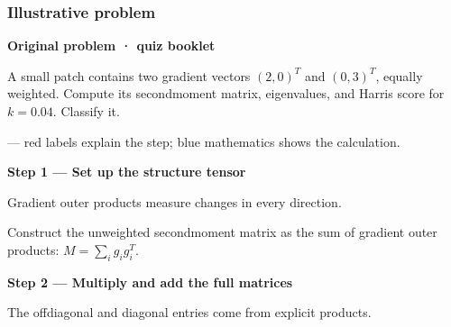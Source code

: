\documentclass[letterpaper,11pt,english,openany,oneside]{jupyterBook}
\begin{document}
\subsubsection{Illustrative problem}
\label{\detokenize{lectures/lecture05/quiz-workbook:illustrative-problem}}\label{\detokenize{lectures/lecture05/quiz-workbook:quiz-a2-q1}}
\par\medskip\textbf{Original problem · quiz booklet}\par\smallskip

\sphinxAtStartPar
A small patch contains two gradient vectors \((2,0)^T\) and \((0,3)^T\), equally weighted. Compute its second\sphinxhyphen{}moment matrix, eigenvalues, and Harris score for \(k=0.04\). Classify it.

\par\medskip

\sphinxAtStartPar
{} — red labels explain the step; blue mathematics shows the calculation.

\par\medskip{}
{\color{QuizStepRed}\bfseries Step 1 — Set up the structure tensor}\par\smallskip

\sphinxAtStartPar
{} Gradient outer products measure changes in every direction.

\sphinxAtStartPar
Construct the unweighted second\sphinxhyphen{}moment matrix as the sum of gradient outer products: {\color{QuizMathBlue} \(M=\sum_i g_ig_i^T\)}.

\par

\par\medskip{}
{\color{QuizStepRed}\bfseries Step 2 — Multiply and add the full matrices}\par\smallskip

\sphinxAtStartPar
{} The off\sphinxhyphen{}diagonal and diagonal entries come from explicit products.
\end{document}
